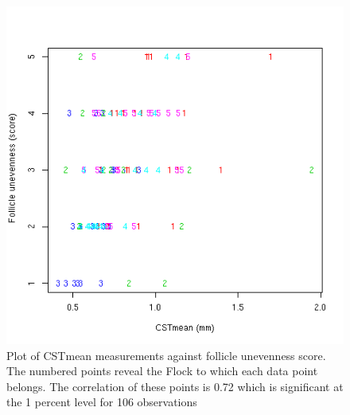 %

\begin{figure}[!h]
  \centering
  \includegraphics[width=1.0\textwidth]{CSTFu.png}
  \caption{Plot of CSTmean measurements against follicle unevenness score. The numbered points reveal the Flock to which each data point belongs. The correlation of these points is 0.72 which is significant at the 1 percent level for 106 observations}
  \label{fig:CSTFu}
\end{figure}

%


